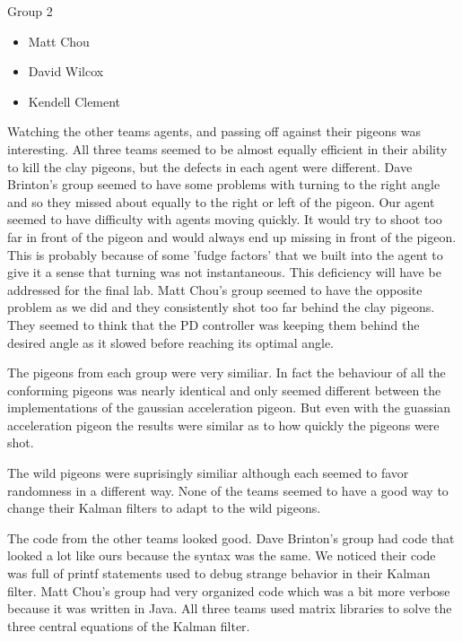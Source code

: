 Group 2
\begin{itemize}
	\item{Matt Chou}
	\item{David Wilcox}
	\item{Kendell Clement}
\end{itemize}
\par
Watching the other teams agents, and passing off against their pigeons was interesting.  All three teams seemed to be almost equally efficient in their ability to kill the clay pigeons, but the defects in each agent were different.  Dave Brinton's group seemed to have some problems with turning to the right angle and so they missed about equally to the right or left of the pigeon.  Our agent seemed to have difficulty with agents moving quickly.  It would try to shoot too far in front of the pigeon and would always end up missing in front of the pigeon.  This is probably because of some 'fudge factors' that we built into the agent to give it a sense that turning was not instantaneous.  This deficiency will have be addressed for the final lab.  Matt Chou's group seemed to have the opposite problem as we did and they consistently shot too far behind the clay pigeons.  They seemed to think that the PD controller was keeping them behind the desired angle as it slowed before reaching its optimal angle.
\par
The pigeons from each group were very similiar.  In fact the behaviour of all the conforming pigeons was nearly identical and only seemed different between the implementations of the gaussian acceleration pigeon.  But even with the guassian acceleration pigeon the results were similar as to how quickly the pigeons were shot.
\par
The wild pigeons were suprisingly similiar although each seemed to favor randomness in a different way.  None of the teams seemed to have a good way to change their Kalman filters to adapt to the wild pigeons.
\par
The code from the other teams looked good.  Dave Brinton's group had code that looked a lot like ours because the syntax was the same.  We noticed their code was full of printf statements used to debug strange behavior in their Kalman filter.  Matt Chou's group had very organized code which was a bit more verbose because it was written in Java.  All three teams used matrix libraries to solve the three central equations of the Kalman filter.